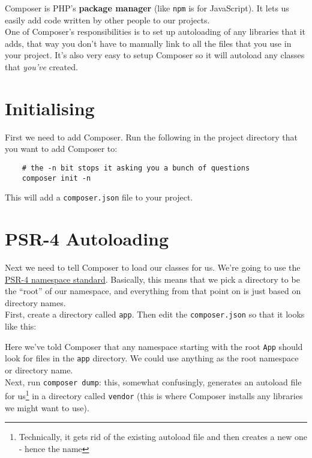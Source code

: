 Composer is PHP's \textbf{package manager} (like \texttt{npm} is for JavaScript). It lets us easily add code written by other people to our projects.
\\

One of Composer's responsibilities is to set up autoloading of any libraries that it adds, that way you don't have to manually link to all the files that you use in your project. It's also very easy to setup Composer so it will autoload any classes that \textit{you've} created.


\section{Initialising}

First we need to add Composer. Run the following in the project directory that you want to add Composer to:

\begin{verbatim}
    # the -n bit stops it asking you a bunch of questions
    composer init -n
\end{verbatim}

This will add a \texttt{composer.json} file to your project.



\section{PSR-4 Autoloading}

Next we need to tell Composer to load our classes for us. We're going to use the \href{https://www.php-fig.org/psr/psr-4/}{PSR-4 namespace standard}. Basically, this means that we pick a directory to be the ``root'' of our namespace, and everything from that point on is just based on directory names.
\\

First, create a directory called \texttt{app}. Then edit the \texttt{composer.json} so that it looks like this:


Here we've told Composer that any namespace starting with the root \texttt{App} should look for files in the \texttt{app} directory. We could use anything as the root namespace or directory name.
\\

Next, run \texttt{composer dump}: this, somewhat confusingly, generates an autoload file for us\footnote{Technically, it gets rid of the existing autoload file and then creates a new one - hence the name} in a directory called \texttt{vendor} (this is where Composer installs any libraries we might want to use).
\\

